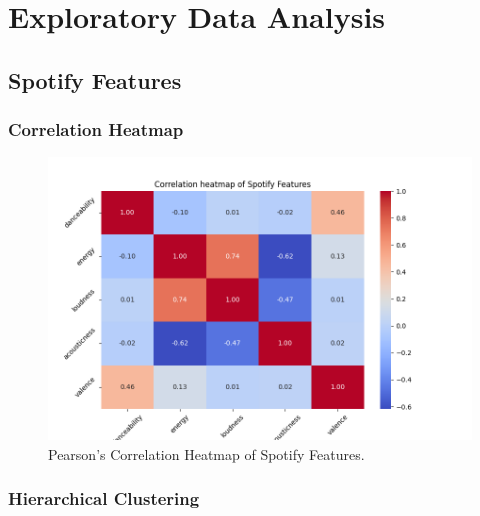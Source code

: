 \chapter{Exploratory Data Analysis}
\label{cha:eda}


\section{Spotify Features}
\label{sec:spotifyfeatures}

\subsection*{Correlation Heatmap}
\label{sec:correlationheatmapsspotifyfeatures}

\begin{center}
\begin{figure}[H]
  \centering
  \includegraphics[width=5in]{img/corr_heatmap_spotify_features.png}
  \caption{Pearson's Correlation Heatmap of Spotify Features.}
  \label{Figure:fig_beh}
\end{figure}
\end{center}

\subsection*{Hierarchical Clustering}
\label{sec:hierarchicalclustering}

